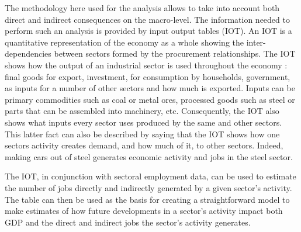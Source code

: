 \documentclass[12pt,english]{article}
\begin{document}
 
The methodology here used for the analysis allows to take into account both direct and indirect consequences on the macro-level. The information needed to perform such an analysis is provided by input output tables (IOT). %
An IOT is a quantitative representation of the economy as a whole showing the inter-dependencies between sectors formed by the procurement relationships. %
The IOT shows how the output of an industrial sector is used throughout the economy : final goods for export, investment, for consumption by households, government, as inputs for a number of other sectors and how much is exported. Inputs can be primary commodities such as coal or metal ores, processed goods such as steel or parts that can be assembled into machinery, etc. Consequently, the IOT also shows what inputs every sector uses produced by the same and other sectors. This latter fact can also be described by saying that the IOT shows how one sectors activity creates demand, and how much of it, to other sectors. Indeed, making cars out of steel generates economic activity and jobs in the steel sector. 

The IOT, in conjunction with sectoral employment data, can be used to estimate the number of jobs directly and indirectly generated by a given sector's activity. The table can then be used as the basis for creating a straightforward model to make estimates of how future developments in a sector's activity impact both GDP and the direct and indirect jobs the sector's activity generates.

\end{document}
